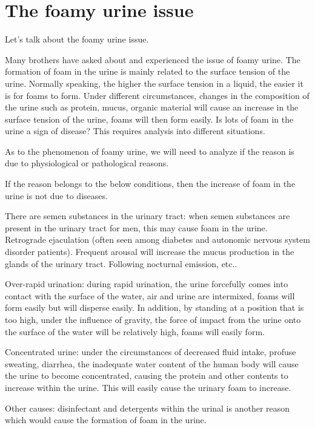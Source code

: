 \documentclass[
]{book}
\begin{document}
\hypertarget{the-foamy-urine-issue}{%
\section{The foamy urine issue}\label{the-foamy-urine-issue}}

Let's talk about the foamy urine issue.

Many brothers have asked about and experienced the issue of foamy urine. The formation of foam in the urine is mainly related to the surface tension of the urine. Normally speaking, the higher the surface tension in a liquid, the easier it is for foams to form. Under different circumstances, changes in the composition of the urine such as protein, mucus, organic material will cause an increase in the surface tension of the urine, foams will then form easily. Is lots of foam in the urine a sign of disease? This requires analysis into different situations.

As to the phenomenon of foamy urine, we will need to analyze if the reason is due to physiological or pathological reasons.

If the reason belongs to the below conditions, then the increase of foam in the urine is not due to diseases.

There are semen substances in the urinary tract: when semen substances are present in the urinary tract for men, this may cause foam in the urine. Retrograde ejaculation (often seen among diabetes and autonomic nervous system disorder patients). Frequent arousal will increase the mucus production in the glands of the urinary tract. Following nocturnal emission, etc..

Over-rapid urination: during rapid urination, the urine forcefully comes into contact with the surface of the water, air and urine are intermixed, foams will form easily but will disperse easily. In addition, by standing at a position that is too high, under the influence of gravity, the force of impact from the urine onto the surface of the water will be relatively high, foams will easily form.

Concentrated urine: under the circumstances of decreased fluid intake, profuse sweating, diarrhea, the inadequate water content of the human body will cause the urine to become concentrated, causing the protein and other contents to increase within the urine. This will easily cause the urinary foam to increase.

Other causes: disinfectant and detergents within the urinal is another reason which would cause the formation of foam in the urine.
\end{document}

